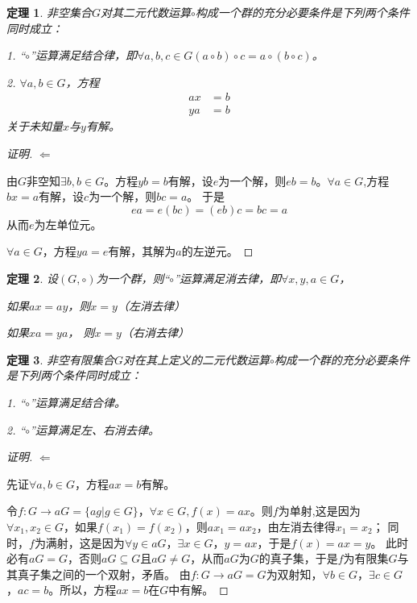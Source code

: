 \documentclass{article}
\newtheorem{Thm}{定理}
\begin{document}
\begin{CJK*}{UTF8}{gbsn}
  \begin{Thm}
    非空集合$G$对其二元代数运算$\circ$构成一个群的充分必要条件是下列两个条件同时成立：
  
    1. “$\circ$”运算满足结合律，即$\forall a,b,c\in G (a\circ b)\circ c=a\circ(b\circ c)$。
  
    2. $\forall a,b\in G$，方程
    \begin{align*}
      ax&=b\\
      ya&=b
     \end{align*}
     关于未知量$x$与$y$有解。
  \end{Thm}
  \begin{proof}[证明]
  
    $\Leftarrow$
  
    由$G$非空知$\exists b,b\in G$。方程$yb=b$有解，设$e$为一个解，则$eb=b$。$\forall a\in G$,方程$bx=a$有解，设$c$为一个解，则$bc=a$。
    于是
    \[ea=e(bc)=(eb)c=bc=a\]
    从而$e$为左单位元。
  
    $\forall a\in G$，方程$ya=e$有解，其解为$a$的左逆元。
  \end{proof}
  \begin{Thm}
    设$(G,\circ)$为一个群，则“$\circ$”运算满足消去律，即$\forall x, y, a\in G$，
  
    如果$ax = ay$，则$x=y$（左消去律）
  
    如果$xa = ya$， 则$x=y$（右消去律）
  \end{Thm}
  
  \begin{Thm}
    非空有限集合$G$对在其上定义的二元代数运算$\circ$构成一个群的充分必要条件是下列两个条件同时成立：
  
    1. “$\circ$”运算满足结合律。
  
    2. “$\circ$”运算满足左、右消去律。
  \end{Thm}
  \begin{proof}[证明]
  $\Leftarrow$
  
  先证$\forall a,b\in G$，方程$ax=b$有解。
  
  令$f:G\to aG=\{ag|g\in G\}$，$\forall x\in G, f(x)=ax$。则$f$为单射,这是因为$\forall x_1,x_2\in G$，如果$f(x_1)=f(x_2)$，则$ax_1=ax_2$，由左消去律得$x_1=x_2$；
  同时，$f$为满射，这是因为$\forall y\in aG$，$\exists x\in G$，$y=ax$，于是$f(x)=ax=y$。
  此时必有$aG=G$，否则$aG\subseteq G$且$aG\neq G$，从而$aG$为$G$的真子集，于是$f$为有限集$G$与其真子集之间的一个双射，矛盾。
  由$f:G\to aG=G$为双射知，$\forall b\in G$，$\exists c\in G$，$ac=b$。所以，方程$ax=b$在$G$中有解。
  

\end{proof}
\end{CJK*}
\end{document}
